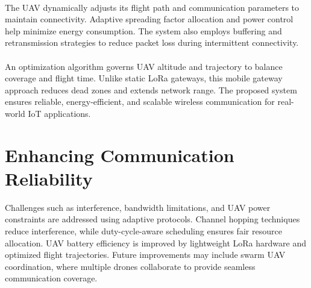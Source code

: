 \paragraph{}
The UAV dynamically adjusts its flight path and communication parameters to maintain connectivity. Adaptive spreading factor allocation and power control help minimize energy consumption. The system also employs buffering and retransmission strategies to reduce packet loss during intermittent connectivity.

\paragraph{}
An optimization algorithm governs UAV altitude and trajectory to balance coverage and flight time. Unlike static LoRa gateways, this mobile gateway approach reduces dead zones and extends network range. The proposed system ensures reliable, energy-efficient, and scalable wireless communication for real-world IoT applications.

\section{Enhancing Communication Reliability}
Challenges such as interference, bandwidth limitations, and UAV power constraints are addressed using adaptive protocols. Channel hopping techniques reduce interference, while duty-cycle-aware scheduling ensures fair resource allocation. UAV battery efficiency is improved by lightweight LoRa hardware and optimized flight trajectories. Future improvements may include swarm UAV coordination, where multiple drones collaborate to provide seamless communication coverage.\cite{inbook}\cite{inproceedings}
